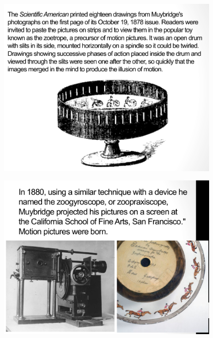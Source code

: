 \documentclass{beamer}
\begin{document}
\begin{frame}
	\begin{figure}
		\centering
		\includegraphics[scale=0.4]{100.jpg}
	\end{figure}
\end{frame}

\begin{frame}
	\begin{figure}
		\centering
		\includegraphics[scale=0.4]{101.jpg}
	\end{figure}
\end{frame}
\end{document}
